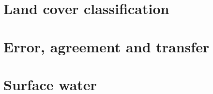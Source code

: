 \documentclass[11pt,a4paper,oneside]{book}
\begin{document}
%
\part{Land cover classification}


%
\part{Error, agreement and transfer}






%
\part{Surface water}

%
% 
% 
% 


\renewcommand{\bibname}{References}
\end{document}
